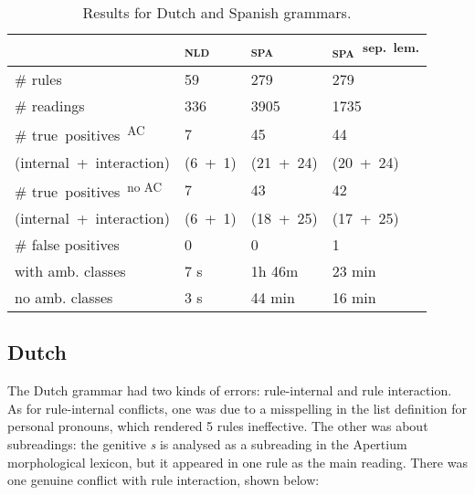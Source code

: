 {{\begin{table}[h]
\centering
\begin{tabular}{|p{2.84cm}|p{1cm}|p{1.15cm}|p{1.55cm}|}

\hline
                   & \textsc{nld}  & \textsc{spa}  & \textsc{spa}~\textsuperscript{sep.~lem.} \\ \hline
\# rules           & 59            & 279       & 279     \\ \hline
\# readings        & 336           & 3905      & 1735    \\ \hline
\# true~positives~\textsuperscript{AC}%
                   & 7             & 45        & 44      \\
{\small (internal~+~interaction)}
                   & {\small
                      (6~+~1)}     & {\small
                                    (21~+~24)} & {\small (20~+~24)} \\ \hline

\# true~positives~\textsuperscript{no AC}  & 7             & 43        & 42      \\
{\small (internal~+~interaction)}
                   & {\small
                      (6~+~1)}     & {\small
                                    (18~+~25)} & {\small (17~+~25)} \\ \hline
\# false positives
                   & 0             & 0        & 1  \\ \hline

\clock{} with amb.
           classes & 7 s        & 1h 46m   &  23 min  \\ \hline

\clock{} no amb.
           classes & 3 s        & 44 min       & 16 min     \\ \hline


\end{tabular}
\caption{Results for Dutch and Spanish grammars.}
\label{table:res}
\end{table}

\subsection{Dutch} The Dutch grammar had two kinds of errors: rule-internal and rule interaction. As for rule-internal conflicts, one was due to a misspelling in the list definition for personal pronouns, which rendered 5 rules ineffective. The other was about subreadings: the genitive \emph{s} is analysed as a subreading in the Apertium morphological lexicon, but it appeared in one rule as the main reading.
There was one genuine conflict with rule interaction, shown below:

}}
